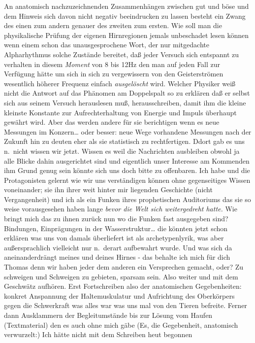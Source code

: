 \documentclass[
]{article}
\begin{document}
An anatomisch nachzuzeichnenden Zusammenhängen zwischen gut und böse und
dem Hinweis sich davon nicht negativ beeindrucken zu lassen besteht ein
Zwang des einen zum andern genauer des zweiten zum ersten. Wie soll man
die physikalische Prüfung der eigenen Hirnregionen jemals unbeschadet
lesen können wenn einem schon das unausgesprochene Wort, der nur
mitgedachte Alpharhythmus solche Zustände bereitet, daß jeder Versuch
sich entspannt zu verhalten in diesem \emph{Moment} von 8 bis 12Hz den
man auf jeden Fall zur Verfügung hätte um sich in sich zu vergewissern
von den Geisterströmen wesentlich höherer Frequenz einfach
\emph{ausgelöscht} wird. Welcher Physiker weiß nicht die Antwort auf das
Phänomen am Doppelspalt so zu erklären daß er selbst sich aus seinem
Versuch herauslesen muß, herausschreiben, damit ihm die kleine kleinste
Konstante zur Aufrechterhaltung von Energie und Impuls überhaupt gewährt
wird. Aber das werden andere für sie berichtigen wenn es neue Messungen
im Konzern\ldots{} oder besser: neue Wege vorhandene Messungen nach der
Zukunft hin zu deuten eher als sie statistisch zu rechtfertigen. Ddort
gab es uns n.~nicht wissen wir jetzt. Wissen es weil die Nachrichten
ausbleiben obwohl ja alle Blicke dahin ausgerichtet sind und eigentlich
unser Interesse am Kommenden ihm Grund genug sein könnte sich uns doch
bitte zu offenbaren. Ich habe und die Protagonisten gelernt wie wir uns
verständigen können ohne gegenseitiges Wissen voneinander; sie ihn ihrer
weit hinter mir liegenden Geschichte (nicht Vergangenheit) und ich als
ein Funken ihres prophetischen Auditoriums das sie so weise
vorausgesehen haben lange \emph{bevor die Welt sich weitergedreht
hatte.} Wie bringt mich das zu ihnen zurück nun wo die Funken fast
ausgegeben sind? Bindungen, Einprägungen in der Wasserstruktur\ldots{}
die könnten jetzt schon erklären was uns von damals überliefert ist als
archetypenlyrik, was aber außersprachlich vielleicht nur n.~derart
aufbewahrt wurde. Und was sich da aneinanderdrängt meines und deines
Hirnes - das behalte ich mich für dich Thomas denn wir haben jeder dem
anderen ein Versprechen gemacht, oder? Zu schweigen und Schweigen zu
gebieten, sparsam sein. Also weiter und mit dem Geschwätz aufhören. Erst
Fortschreiben also der anatomischen Gegebenheiten: konkret Anspannung
der Haltemuskulatur und Aufrichtung des Oberkörpers gegen die
Schwerkraft was alles war was uns mal von den Tieren befreite. Ferner
dann Ausklammern der Begleitumstände bis zur Lösung vom Haufen
(Textmaterial) den es auch ohne mich gäbe (Es, die Gegebenheit,
anatomisch verwurzelt:) Ich hätte nicht mit dem Schreiben heut begonnen
\end{document}
